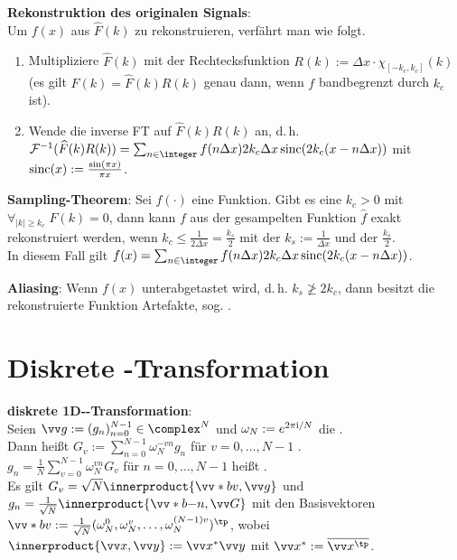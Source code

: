 \textbf{Rekonstruktion des originalen Signals}:\\
Um $f(x)$ aus $\widehat{F}(k)$ zu rekonstruieren, verfährt man wie folgt.
\begin{enumerate}
    \item
    Multipliziere $\widehat{F}(k)$ mit der Rechtecksfunktion
    $R(k) := \Delta x \cdot \chi_{[-k_c,k_c]}(k)$\\
    (es gilt $F(k) = \widehat{F}(k) R(k)$ genau dann, wenn $f$ bandbegrenzt durch $k_c$ ist).

    \item
    Wende die inverse FT auf $\widehat{F}(k) R(k)$ an, d.\,h.\\
    $\F^{-1}(\widehat{F}(k) R(k))
    = \sum_{n \in \integer} f(n\Delta x) 2k_c \Delta x \sinc(2k_c (x - n\Delta x))$
    mit $\operatorname{sinc}(x) := \frac{\sin(\pi x)}{\pi x}$.
\end{enumerate}

\textbf{Sampling-Theorem}:
Sei $f(\cdot)$ eine Funktion.
Gibt es eine  $k_c > 0$ mit\\
$\forall_{|k| \ge k_c}\; F(k) = 0$, dann kann $f$ aus der
gesampelten Funktion $\widehat{f}$ exakt rekonstruiert werden,
wenn $k_c \le \frac{1}{2 \Delta x} = \frac{k_s}{2}$
mit der  $k_s := \frac{1}{\Delta x}$ und
der  $\frac{k_s}{2}$.\\
In diesem Fall gilt
$f(x) = \sum_{n \in \integer} f(n\Delta x) 2k_c \Delta x \sinc(2k_c (x - n\Delta x))$.

\textbf{Aliasing}:
Wenn $f(x)$ unterabgetastet wird, d.\,h. $k_s \not\ge 2k_c$,
dann besitzt die rekonstruierte Funktion Artefakte, sog. .

\section{%
    Diskrete -Transformation%
}

\textbf{diskrete 1D--Transformation}:\\
Seien $\vec{g} := (g_n)_{n=0}^{N-1} \in \complex^N$
und $\omega_N := e^{2\pi\text{i}/N}$ die .\\
Dann heißt
$G_v := \sum_{n=0}^{N-1} \omega_N^{-vn} g_n$ für $v = 0, \dotsc, N - 1$
.\\
$g_n = \frac{1}{N} \sum_{v=0}^{N-1} \omega_N^{vn} G_v$ für $n = 0, \dotsc, N - 1$
heißt .\\
Es gilt $G_v = \sqrt{N} \innerproduct{\vecs{b}{v}, \vec{g}}$
und $g_n = \frac{1}{\sqrt{N}} \innerproduct{\vecs{b}{-n}, \vec{G}}$ mit den Basisvektoren\\
$\vecs{b}{v} := \frac{1}{\sqrt{N}}
(\omega_N^0, \omega_N^{v}, \dotsc, \omega_N^{(N-1)v})^\tp$,
wobei $\innerproduct{\vec{x}, \vec{y}} := \vec{x}^\ast \vec{y}$ mit
$\vec{x}^\ast := \overline{\vec{x}^\tp}$.

